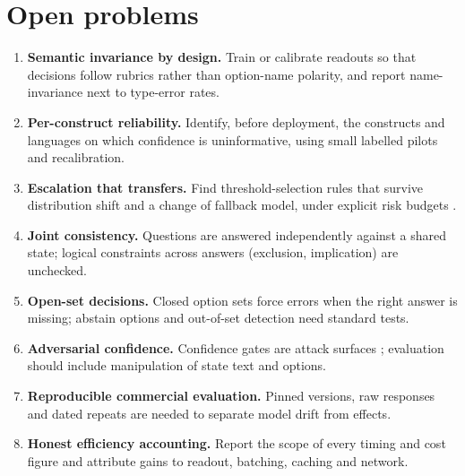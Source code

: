 \section{Open problems}\label{sec:open-problems}

\begin{enumerate}[leftmargin=*,itemsep=2pt]
  \item \textbf{Semantic invariance by design.} Train or calibrate readouts so that decisions follow rubrics rather than option-name polarity, and report name-invariance next to type-error rates.
  \item \textbf{Per-construct reliability.} Identify, before deployment, the constructs and languages on which confidence is uninformative, using small labelled pilots and recalibration.
  \item \textbf{Escalation that transfers.} Find threshold-selection rules that survive distribution shift and a change of fallback model, under explicit risk budgets \citep{arxiv2310_05921,arxiv2107_07511}.
  \item \textbf{Joint consistency.} Questions are answered independently against a shared state; logical constraints across answers (exclusion, implication) are unchecked.
  \item \textbf{Open-set decisions.} Closed option sets force errors when the right answer is missing; abstain options and out-of-set detection need standard tests.
  \item \textbf{Adversarial confidence.} Confidence gates are attack surfaces \citep{arxiv2608_06571,arxiv2609_04445}; evaluation should include manipulation of state text and options.
  \item \textbf{Reproducible commercial evaluation.} Pinned versions, raw responses and dated repeats are needed to separate model drift from effects.
  \item \textbf{Honest efficiency accounting.} Report the scope of every timing and cost figure and attribute gains to readout, batching, caching and network.
\end{enumerate}
